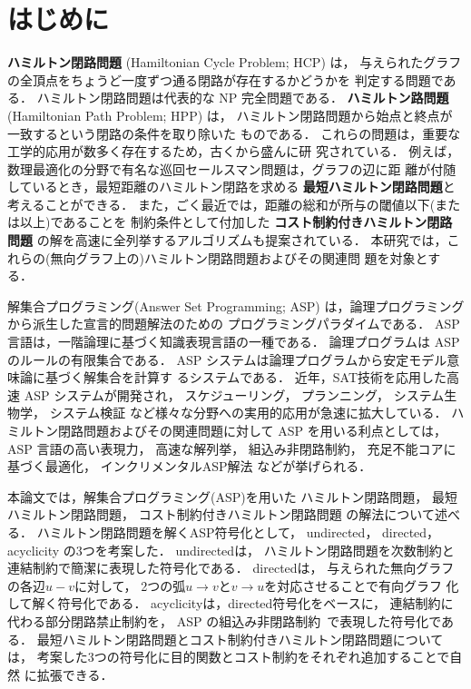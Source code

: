 ﻿%
\section{はじめに}

\textbf{ハミルトン閉路問題} (Hamiltonian Cycle Problem; HCP) は，
与えられたグラフの全頂点をちょうど一度ずつ通る閉路が存在するかどうかを
判定する問題である\cite{hirata15:book}．
ハミルトン閉路問題は代表的な NP 完全問題である．
\textbf{ハミルトン路問題} (Hamiltonian Path Problem; HPP) は，
ハミルトン閉路問題から始点と終点が一致するという閉路の条件を取り除いた
ものである．
これらの問題は，重要な工学的応用が数多く存在するため，古くから盛んに研
究されている．
例えば，数理最適化の分野で有名な巡回セールスマン問題は，グラフの辺に距
離が付随しているとき，最短距離のハミルトン閉路を求める
\textbf{最短ハミルトン閉路問題}と考えることができる．
また，ごく最近では，距離の総和が所与の閾値以下(または以上)であることを
制約条件として付加した
\textbf{コスト制約付きハミルトン閉路問題}
の解を高速に全列挙するアルゴリズムも提案されている\cite{comp20:Minato}．
本研究では，これらの(無向グラフ上の)ハミルトン閉路問題およびその関連問
題を対象とする．

解集合プログラミング(Answer Set Programming; ASP\cite{%
  Baral03:cambridge,%
  Gelfond88:iclp,%
  Inoue08:jssst,%
  Niemela99:amai})
は，論理プログラミングから派生した宣言的問題解法のための
プログラミングパラダイムである．
ASP言語は，一階論理に基づく知識表現言語の一種である．
論理プログラムは ASP のルールの有限集合である．
ASP システムは論理プログラムから安定モデル意味論に基づく解集合を計算す
るシステムである．
近年，SAT技術を応用した高速 ASP システムが開発され，
スケジューリング，
プランニング，
システム生物学，
システム検証
など様々な分野への実用的応用が急速に拡大している．
%
ハミルトン閉路問題およびその関連問題に対して ASP を用いる利点としては，
ASP 言語の高い表現力，
高速な解列挙，
組込み非閉路制約，
充足不能コアに基づく最適化，
インクリメンタルASP解法
などが挙げられる．

本論文では，解集合プログラミング(ASP)を用いた
ハミルトン閉路問題，
最短ハミルトン閉路問題，
コスト制約付きハミルトン閉路問題
の解法について述べる．
%
ハミルトン閉路問題を解くASP符号化として，
\textsf{undirected}，
\textsf{directed}，
\textsf{acyclicity}
の3つを考案した．
\textsf{undirected}は，
ハミルトン閉路問題を次数制約と連結制約で簡潔に表現した符号化である．
\textsf{directed}は，
与えられた無向グラフの各辺$u-v$に対して，
2つの弧$u\rightarrow v$と$v\rightarrow u$を対応させることで有向グラフ
化して解く符号化である．
\textsf{acyclicity}は，\textsf{directed}符号化をベースに，
連結制約に代わる部分閉路禁止制約を，
ASP の組込み非閉路制約~\cite{bomanson16:acyclicity}で表現した符号化である．
最短ハミルトン閉路問題とコスト制約付きハミルトン閉路問題については，
考案した3つの符号化に目的関数とコスト制約をそれぞれ追加することで自然
に拡張できる．

